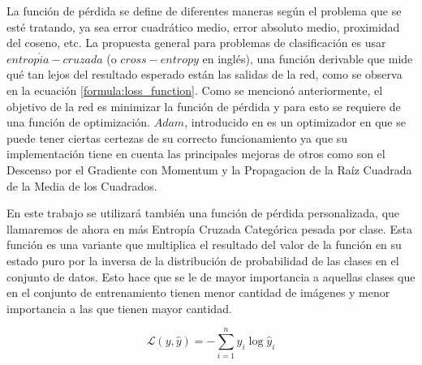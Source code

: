   La función de pérdida se define de diferentes maneras según el problema que se esté tratando, ya sea error cuadrático medio, error absoluto medio, proximidad del coseno, etc. La propuesta general para problemas de clasificación es usar \(entrop{\acute i}a-cruzada\) (o \(cross-entropy\) en inglés), una función derivable que mide qué tan lejos del resultado esperado están las salidas de la red, como se observa en la ecuación \ref{formula:loss_function}. Como se mencionó anteriormente, el objetivo de la red es minimizar la función de pérdida y para esto se requiere de una función de optimización. \(Adam\), introducido en \cite{kingma2014adam} es un optimizador en que se puede tener ciertas certezas de su correcto funcionamiento ya que su implementación tiene en cuenta las principales mejoras de otros como son el Descenso por el Gradiente con Momentum y la Propagacion de la Raíz Cuadrada de la Media de los Cuadrados.
  
  En este trabajo se utilizará también una función de pérdida personalizada, que llamaremos de ahora en más Entropía Cruzada Categórica pesada por clase. Esta función es una variante que multiplica el resultado del valor de la función en su estado puro por la inversa de la distribución de probabilidad de las clases en el conjunto de datos. Esto hace que se le de mayor importancia a aquellas clases que en el conjunto de entrenamiento tienen menor cantidad de imágenes y menor importancia a las que tienen mayor cantidad.
  
  \begin{equation}\label{formula:custom_loss_function}
  \mathcal{L}(y, \hat{y})=-\sum_{i=1}^{n} y_{i} \log \hat{y}_{i}
  \end{equation}
  
